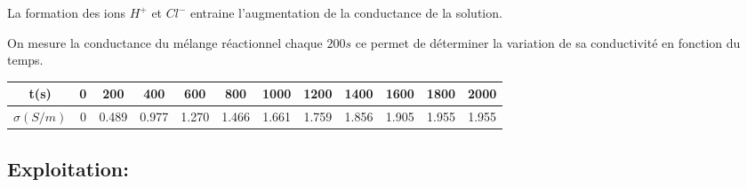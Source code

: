 \documentclass[12pt]{article}
\begin{document}
La formation des ions $H^+$ et $Cl^-$ entraine l'augmentation de la conductance de la solution.

On mesure la conductance du mélange réactionnel chaque $200s$ ce permet de déterminer la variation de sa conductivité en fonction du temps.

\begin{center}
   \begin{tabular}{|c|c|c|c|c|c|c|c|c|c|c|c|}
	  \hline
	  t(s)         &0&200  &400   &600  & 800 &1000 &1200 &1400 &1600 &1800 &2000 \\\hline
	  $\sigma(S/m)$&0&0.489&0.977 &1.270&1.466&1.661&1.759&1.856&1.905&1.955&1.955\\\hline
   \end{tabular}
\end{center}
\subsection{Exploitation: }
\end{document}

